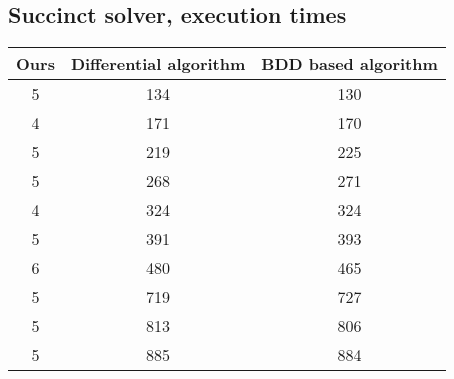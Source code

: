 \documentclass{report}
\begin{document}
\subsection{Succinct solver, execution times}
\begin{center}
	\begin{tabular}{ | c | c | c | }
		\hline
		Ours & Differential algorithm & BDD based algorithm \\
		\hline
		\hline
		5 & 134 & 130 \\
		4 & 171 & 170 \\
		5 & 219 & 225 \\
		5 & 268 & 271 \\
		4 & 324 & 324 \\
		5 & 391 & 393 \\
		6 & 480 & 465 \\
		5 & 719 & 727 \\
		5 & 813 & 806 \\
		5 & 885 & 884 \\
		\hline
	\end{tabular}
\end{center}
\end{document}

